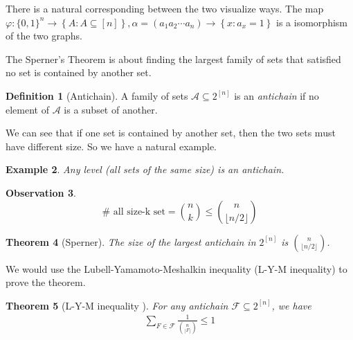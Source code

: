 \documentclass{article}
\newtheorem{theorem}{Theorem}[section]
\newtheorem{observation}[theorem]{Observation}
\newtheorem{example}[theorem]{Example}
\theoremstyle{definition}
\newtheorem{definition}[theorem]{Definition}
\renewcommand{\phi}{\varphi}
\begin{document}
There is a natural corresponding between the two visualize ways.
The map $\phi:\{0,1\}^n \to \left \{ A : A\subseteq[n] \right \},\alpha=(a_1 a_2 \cdots a_n) \to 
    \left \{ x : a_x=1 \right \}$ is a isomorphism of the two graphs.

The Sperner's Theorem is about finding the largest family of sets that satisfied no set is contained by another set. 

\begin{definition}[Antichain]
  A family of sets $\mathcal{A}\subseteq 2^{[n]}$ is an \emph{antichain} if no element of $\mathcal{A}$ is a subset of another.
\end{definition}

We can see that if one set is contained by another set, then the two sets must have different size. So we have a natural example.

\begin{example}
    Any level (all sets of the same size) is an antichain.
\end{example}

\begin{observation}
    $$ \# \text{ all size-k set}=  \binom{n}{k} 
   \le \binom{n}{\lfloor n/2\rfloor}$$
\end{observation}

\begin{theorem}[Sperner\cite{SpernerThm}]\label{SpernerThm}
    The size of the largest antichain in $2^{[n]}$ is $\binom{n}{\lfloor n/2\rfloor}$.
\end{theorem}

We would use the Lubell-Yamamoto-Meshalkin inequality (L-Y-M inequality) to prove the theorem.

\begin{theorem}[L-Y-M inequality \cite{LYMinequality}]\label{thm:LYM}
    For any antichain $\mathcal{F}\subseteq 2^{[n]}$, we have 
\begin{align*}
    \sum_{F\in \mathcal{F}}\frac{1}{\binom{n}{|F|}}\le 1
\end{align*}
\end{theorem}
\end{document}
